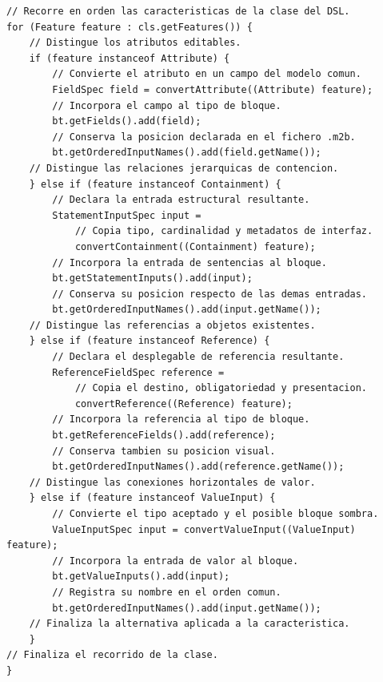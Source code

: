 \begin{lstlisting}[style=tfmjava, captionpos=t, caption={Despacho comentado de elementos del DSL en \texttt{DomainModelAdapter}}, label={lst:despacho-domainmodel-adapter}]
// Recorre en orden las caracteristicas de la clase del DSL.
for (Feature feature : cls.getFeatures()) {
    // Distingue los atributos editables.
    if (feature instanceof Attribute) {
        // Convierte el atributo en un campo del modelo comun.
        FieldSpec field = convertAttribute((Attribute) feature);
        // Incorpora el campo al tipo de bloque.
        bt.getFields().add(field);
        // Conserva la posicion declarada en el fichero .m2b.
        bt.getOrderedInputNames().add(field.getName());
    // Distingue las relaciones jerarquicas de contencion.
    } else if (feature instanceof Containment) {
        // Declara la entrada estructural resultante.
        StatementInputSpec input =
            // Copia tipo, cardinalidad y metadatos de interfaz.
            convertContainment((Containment) feature);
        // Incorpora la entrada de sentencias al bloque.
        bt.getStatementInputs().add(input);
        // Conserva su posicion respecto de las demas entradas.
        bt.getOrderedInputNames().add(input.getName());
    // Distingue las referencias a objetos existentes.
    } else if (feature instanceof Reference) {
        // Declara el desplegable de referencia resultante.
        ReferenceFieldSpec reference =
            // Copia el destino, obligatoriedad y presentacion.
            convertReference((Reference) feature);
        // Incorpora la referencia al tipo de bloque.
        bt.getReferenceFields().add(reference);
        // Conserva tambien su posicion visual.
        bt.getOrderedInputNames().add(reference.getName());
    // Distingue las conexiones horizontales de valor.
    } else if (feature instanceof ValueInput) {
        // Convierte el tipo aceptado y el posible bloque sombra.
        ValueInputSpec input = convertValueInput((ValueInput) feature);
        // Incorpora la entrada de valor al bloque.
        bt.getValueInputs().add(input);
        // Registra su nombre en el orden comun.
        bt.getOrderedInputNames().add(input.getName());
    // Finaliza la alternativa aplicada a la caracteristica.
    }
// Finaliza el recorrido de la clase.
}
\end{lstlisting}

